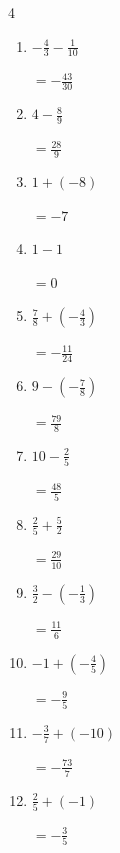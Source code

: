 \begin{multicols}{4}
\begin{enumerate}
        $\displaystyle =-\frac{1}{3}$

  \item $\displaystyle -\frac{4}{3} - \frac{1}{10}$

        $\displaystyle =-\frac{43}{30}$

  \item $\displaystyle 4 - \frac{8}{9}$

        $\displaystyle =\frac{28}{9}$

  \item $\displaystyle 1 + \left(-8\right)$

        $\displaystyle =-7$

  \item $\displaystyle 1 - 1$

        $\displaystyle =0$

  \item $\displaystyle \frac{7}{8} + \left(-\frac{4}{3}\right)$

        $\displaystyle =-\frac{11}{24}$

  \item $\displaystyle 9 - \left(-\frac{7}{8}\right)$

        $\displaystyle =\frac{79}{8}$

  \item $\displaystyle 10 - \frac{2}{5}$

        $\displaystyle =\frac{48}{5}$

  \item $\displaystyle \frac{2}{5} + \frac{5}{2}$

        $\displaystyle =\frac{29}{10}$

  \item $\displaystyle \frac{3}{2} - \left(-\frac{1}{3}\right)$

        $\displaystyle =\frac{11}{6}$

\columnbreak %

  \item $\displaystyle -1 + \left(-\frac{4}{5}\right)$

        $\displaystyle =-\frac{9}{5}$

  \item $\displaystyle -\frac{3}{7} + \left(-10\right)$

        $\displaystyle =-\frac{73}{7}$

  \item $\displaystyle \frac{2}{5} + \left(-1\right)$

        $\displaystyle =-\frac{3}{5}$


\end{enumerate}
\end{multicols}
